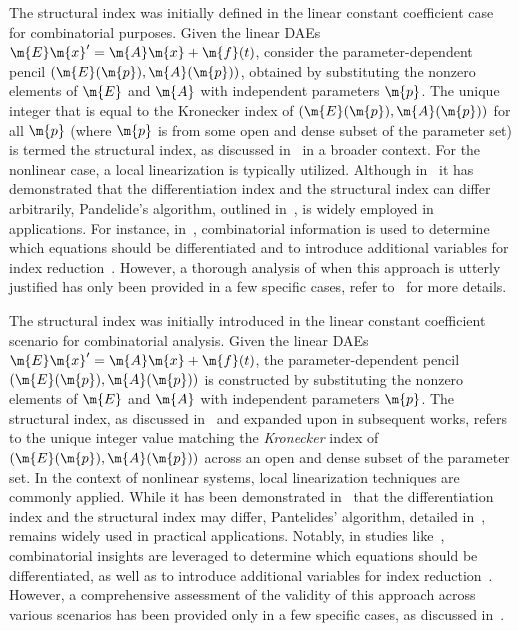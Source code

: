 The structural index was initially defined in the linear constant coefficient case for combinatorial purposes. Given the linear \acp{DAE} $\m{E}\m{x}^{\prime} = \m{A}\m{x} + \m{f}(t)$, consider the parameter-dependent pencil $(\m{E}(\m{p}), \m{A}(\m{p}))$, obtained by substituting the nonzero elements of $\m{E}$ and $\m{A}$ with independent parameters $\m{p}$. The unique integer that is equal to the Kronecker index of $(\m{E}(\m{p}), \m{A}(\m{p}))$ for all $\m{p}$ (where $\m{p}$ is from some open and dense subset of the parameter set) is termed the structural index, as discussed in~\cite{pantelides1988consistent, pryce2001simple} in a broader context. For the nonlinear case, a local linearization is typically utilized. Although in~\cite{reissig2000differential} it has demonstrated that the differentiation index and the structural index can differ arbitrarily, Pandelide's algorithm, outlined in~\cite{pantelides1988consistent}, is widely employed in applications. For instance, in~\cite{unger1995structural}, combinatorial information is used to determine which equations should be differentiated and to introduce additional variables for index reduction~\cite{mattsson1993index}. However, a thorough analysis of when this approach is utterly justified has only been provided in a few specific cases, refer to~\cite{mehrmann2015index} for more details.

The structural index was initially introduced in the linear constant coefficient scenario for combinatorial analysis. Given the linear \acp{DAE} $\m{E}\m{x}^{\prime} = \m{A}\m{x} + \m{f}(t)$, the parameter-dependent pencil $(\m{E}(\m{p}), \m{A}(\m{p}))$ is constructed by substituting the nonzero elements of $\m{E}$ and $\m{A}$ with independent parameters $\m{p}$. The structural index, as discussed in~\cite{pantelides1988consistent, pryce2001simple} and expanded upon in subsequent works, refers to the unique integer value matching the \emph{Kronecker} index of $(\m{E}(\m{p}), \m{A}(\m{p}))$ across an open and dense subset of the parameter set. In the context of nonlinear systems, local linearization techniques are commonly applied. While it has been demonstrated in~\cite{reissig2000differential} that the differentiation index and the structural index may differ, Pantelides' algorithm, detailed in~\cite{pantelides1988consistent}, remains widely used in practical applications. Notably, in studies like~\cite{unger1995structural}, combinatorial insights are leveraged to determine which equations should be differentiated, as well as to introduce additional variables for index reduction~\cite{mattsson1993index}. However, a comprehensive assessment of the validity of this approach across various scenarios has been provided only in a few specific cases, as discussed in~\cite{mehrmann2015index}.

